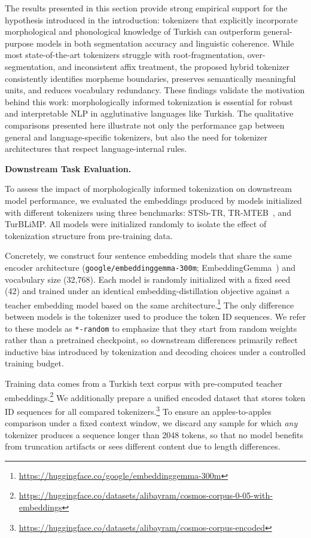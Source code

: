 The results presented in this section provide strong empirical support for the hypothesis introduced in the introduction: tokenizers that explicitly incorporate morphological and phonological knowledge of Turkish can outperform general-purpose models in both segmentation accuracy and linguistic coherence. While most state-of-the-art tokenizers struggle with root-fragmentation, over-segmentation, and inconsistent affix treatment, the proposed hybrid tokenizer consistently identifies morpheme boundaries, preserves semantically meaningful units, and reduces vocabulary redundancy. These findings validate the motivation behind this work: morphologically informed tokenization is essential for robust and interpretable NLP in agglutinative languages like Turkish. The qualitative comparisons presented here illustrate not only the performance gap between general and language-specific tokenizers, but also the need for tokenizer architectures that respect language-internal rules.

\textbf{Downstream Task Evaluation.}

To assess the impact of morphologically informed tokenization on downstream model performance, we evaluated the embeddings produced by models initialized with different tokenizers using three benchmarks: STSb-TR, TR-MTEB~\cite{baysan-gungor-2025-tr}, and TurBLiMP. All models were initialized randomly to isolate the effect of tokenization structure from pre-training data.

Concretely, we construct four sentence embedding models that share the same encoder architecture (\texttt{google/embeddinggemma-300m}; EmbeddingGemma~\cite{vera_embeddinggemma_2025}) and vocabulary size (32,768). Each model is randomly initialized with a fixed seed (42) and trained under an identical embedding-distillation objective against a teacher embedding model based on the same architecture.\footnote{\url{https://huggingface.co/google/embeddinggemma-300m}} The only difference between models is the tokenizer used to produce the token ID sequences. We refer to these models as \texttt{*-random} to emphasize that they start from random weights rather than a pretrained checkpoint, so downstream differences primarily reflect inductive bias introduced by tokenization and decoding choices under a controlled training budget.

Training data comes from a Turkish text corpus with pre-computed teacher embeddings.\footnote{\url{https://huggingface.co/datasets/alibayram/cosmos-corpus-0-05-with-embeddings}} We additionally prepare a unified encoded dataset that stores token ID sequences for all compared tokenizers.\footnote{\url{https://huggingface.co/datasets/alibayram/cosmos-corpus-encoded}} To ensure an apples-to-apples comparison under a fixed context window, we discard any sample for which \emph{any} tokenizer produces a sequence longer than 2048 tokens, so that no model benefits from truncation artifacts or sees different content due to length differences.

